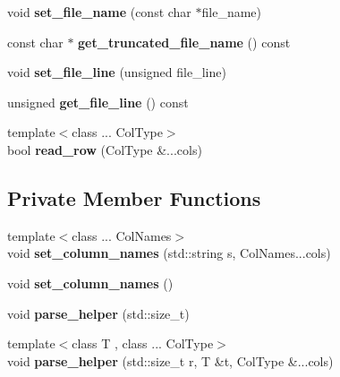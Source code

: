 \begin{DoxyCompactItemize}
\item 
\mbox{\label{classio_1_1CSVReader_a5f1dc083a8fa8661f5ecdcf6aebc7b24}} 
void {\bfseries set\+\_\+file\+\_\+name} (const char $\ast$file\+\_\+name)
\item 
\mbox{\label{classio_1_1CSVReader_abc6321895152f5a34959b499da6512ee}} 
const char $\ast$ {\bfseries get\+\_\+truncated\+\_\+file\+\_\+name} () const
\item 
\mbox{\label{classio_1_1CSVReader_a1303bd6a2eb0d3d7c743212e52839ac4}} 
void {\bfseries set\+\_\+file\+\_\+line} (unsigned file\+\_\+line)
\item 
\mbox{\label{classio_1_1CSVReader_a065f805596018d1568b81152e6a22e0c}} 
unsigned {\bfseries get\+\_\+file\+\_\+line} () const
\item 
\mbox{\label{classio_1_1CSVReader_a61ecdcaa62c024bf97c4e5d133478d7e}} 
{\footnotesize template$<$class ... Col\+Type$>$ }\\bool {\bfseries read\+\_\+row} (Col\+Type \&...cols)
\end{DoxyCompactItemize}
\subsection*{Private Member Functions}
\begin{DoxyCompactItemize}
\item 
\mbox{\label{classio_1_1CSVReader_af0f3df423977925fd22acadbdbc4cdcd}} 
{\footnotesize template$<$class ... Col\+Names$>$ }\\void {\bfseries set\+\_\+column\+\_\+names} (std\+::string s, Col\+Names...\+cols)
\item 
\mbox{\label{classio_1_1CSVReader_a48a56e02ae597ae3506e1b24dc0718ef}} 
void {\bfseries set\+\_\+column\+\_\+names} ()
\item 
\mbox{\label{classio_1_1CSVReader_ada16395fbaedad5fcda248b50cd12da0}} 
void {\bfseries parse\+\_\+helper} (std\+::size\+\_\+t)
\item 
\mbox{\label{classio_1_1CSVReader_a6e2cb67ff14a62cee48fb9042c1bfff9}} 
{\footnotesize template$<$class T , class ... Col\+Type$>$ }\\void {\bfseries parse\+\_\+helper} (std\+::size\+\_\+t r, T \&t, Col\+Type \&...cols)
\end{DoxyCompactItemize}
